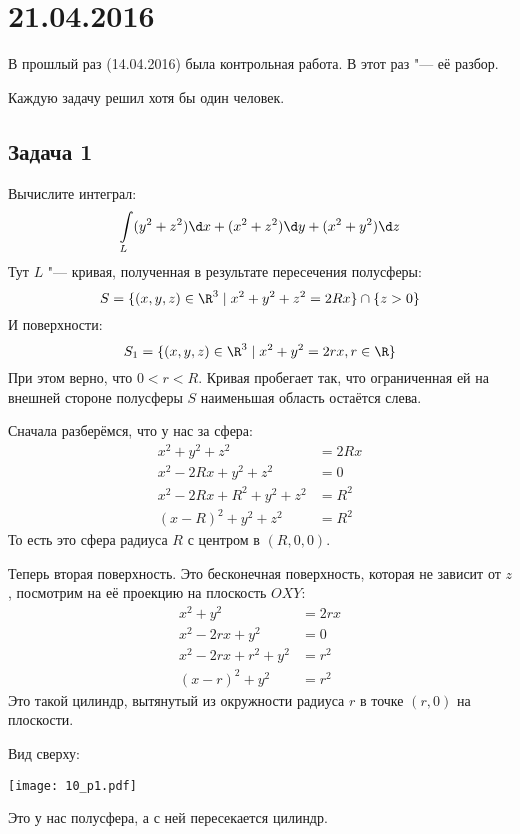 \chapter{21.04.2016}
	В прошлый раз (14.04.2016) была контрольная работа.
	В этот раз "--- её разбор.

	Каждую задачу решил хотя бы один человек.

\section{Задача 1}
	Вычислите интеграл:
	\[ \int\limits_L (y^2+z^2)\d x + (x^2+z^2)\d y + (x^2+y^2)\d z \]
	Тут $L$ "--- кривая, полученная в результате пересечения полусферы:
	\[ S=\{(x, y, z)\in \R^3 \mid x^2+y^2+z^2=2Rx \} \cap \{ z > 0 \} \]
	И поверхности:
	\[ S_1 = \{(x, y, z) \in \R^3 \mid x^2+y^2=2rx, r \in \R \}\]
	При этом верно, что $0 < r < R$.
	Кривая пробегает так, что ограниченная ей на внешней стороне полусферы $S$ наименьшая область остаётся слева.

	Сначала разберёмся, что у нас за сфера:
	\begin{align*}
		x^2+y^2+z^2 &= 2Rx \\
		x^2-2Rx+y^2+z^2 &= 0 \\
		x^2-2Rx+R^2+y^2+z^2 &= R^2 \\
		(x-R)^2+y^2+z^2 &= R^2
	\end{align*}
	То есть это сфера радиуса $R$ с центром в $(R, 0, 0)$.

	Теперь вторая поверхность.
	Это бесконечная поверхность, которая не зависит от $z$, посмотрим на её проекцию на плоскость $OXY$:
	\begin{align*}
		x^2+y^2 &= 2rx \\
		x^2-2rx+y^2 &= 0 \\
		x^2-2rx+r^2+y^2 &= r^2 \\
		(x-r)^2+y^2 &= r^2
	\end{align*}
	Это такой цилиндр, вытянутый из окружности радиуса $r$ в точке $(r, 0)$ на плоскости.

	Вид сверху:
	\begin{center}
		\texttt{[image: 10\_p1.pdf]}
	\end{center}
	Это у нас полусфера, а с ней пересекается цилиндр.

